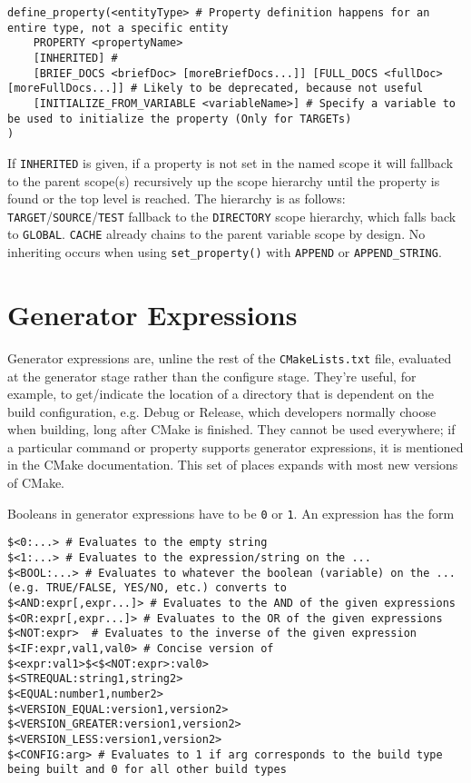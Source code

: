 \documentclass[8pt, table, xcdraw]{article}%
\begin{document}
\begin{lstlisting}
define_property(<entityType> # Property definition happens for an entire type, not a specific entity
    PROPERTY <propertyName>
    [INHERITED] # 
    [BRIEF_DOCS <briefDoc> [moreBriefDocs...]] [FULL_DOCS <fullDoc> [moreFullDocs...]] # Likely to be deprecated, because not useful
    [INITIALIZE_FROM_VARIABLE <variableName>] # Specify a variable to be used to initialize the property (Only for TARGETs)
)
\end{lstlisting}

If \lstinline{INHERITED} is given, if a property is not set in the named scope it will fallback to the parent scope(s) recursively up the scope hierarchy until the property is found or the top level is reached. The hierarchy is as follows: \lstinline{TARGET}/\lstinline{SOURCE}/\lstinline{TEST} fallback to the \lstinline{DIRECTORY} scope hierarchy, which falls back to \lstinline{GLOBAL}. \lstinline{CACHE} already chains to the parent variable scope by design. No inheriting occurs when using \lstinline{set_property()} with \lstinline{APPEND} or \lstinline{APPEND_STRING}.

\section{Generator Expressions}

Generator expressions are, unline the rest of the \lstinline{CMakeLists.txt} file, evaluated at the generator stage rather than the configure stage. They're useful, for example, to get/indicate the location of a directory that is dependent on the build configuration, e.g. Debug or Release, which developers normally choose when building, long after CMake is finished. They cannot be used everywhere; if a particular command or property supports generator expressions, it is mentioned in the CMake documentation. This set of places expands with most new versions of CMake.

Booleans in generator expressions have to be \lstinline{0} or \lstinline{1}. An expression has the form %

\begin{lstlisting}
$<0:...> # Evaluates to the empty string
$<1:...> # Evaluates to the expression/string on the ...
$<BOOL:...> # Evaluates to whatever the boolean (variable) on the ... (e.g. TRUE/FALSE, YES/NO, etc.) converts to
$<AND:expr[,expr...]> # Evaluates to the AND of the given expressions
$<OR:expr[,expr...]> # Evaluates to the OR of the given expressions
$<NOT:expr>  # Evaluates to the inverse of the given expression
$<IF:expr,val1,val0> # Concise version of $<expr:val1>$<$<NOT:expr>:val0>
$<STREQUAL:string1,string2>
$<EQUAL:number1,number2>
$<VERSION_EQUAL:version1,version2>
$<VERSION_GREATER:version1,version2>
$<VERSION_LESS:version1,version2>
$<CONFIG:arg> # Evaluates to 1 if arg corresponds to the build type being built and 0 for all other build types
\end{lstlisting}
\end{document}
